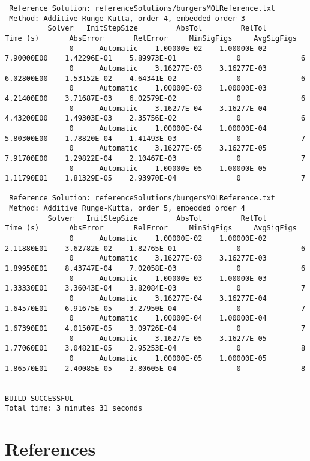 \documentclass[10pt,letterpaper]{article}
\begin{document}
{\begin{verbatim}
 Reference Solution: referenceSolutions/burgersMOLReference.txt
 Method: Additive Runge-Kutta, order 4, embedded order 3
          Solver   InitStepSize         AbsTol         RelTol       Time (s)       AbsError       RelError     MinSigFigs     AvgSigFigs
               0      Automatic    1.00000E-02    1.00000E-02     7.90000E00    1.42296E-01    5.89973E-01              0              6
               0      Automatic    3.16277E-03    3.16277E-03     6.02800E00    1.53152E-02    4.64341E-02              0              6
               0      Automatic    1.00000E-03    1.00000E-03     4.21400E00    3.71687E-03    6.02579E-02              0              6
               0      Automatic    3.16277E-04    3.16277E-04     4.43200E00    1.49303E-03    2.35756E-02              0              6
               0      Automatic    1.00000E-04    1.00000E-04     5.80300E00    1.78820E-04    1.41493E-03              0              7
               0      Automatic    3.16277E-05    3.16277E-05     7.91700E00    1.29822E-04    2.10467E-03              0              7
               0      Automatic    1.00000E-05    1.00000E-05     1.11790E01    1.81329E-05    2.93970E-04              0              7

 Reference Solution: referenceSolutions/burgersMOLReference.txt
 Method: Additive Runge-Kutta, order 5, embedded order 4
          Solver   InitStepSize         AbsTol         RelTol       Time (s)       AbsError       RelError     MinSigFigs     AvgSigFigs
               0      Automatic    1.00000E-02    1.00000E-02     2.11880E01    3.62782E-02    1.82765E-01              0              6
               0      Automatic    3.16277E-03    3.16277E-03     1.89950E01    8.43747E-04    7.02058E-03              0              6
               0      Automatic    1.00000E-03    1.00000E-03     1.33330E01    3.36043E-04    3.82084E-03              0              7
               0      Automatic    3.16277E-04    3.16277E-04     1.64570E01    6.91675E-05    3.27950E-04              0              7
               0      Automatic    1.00000E-04    1.00000E-04     1.67390E01    4.01507E-05    3.09726E-04              0              7
               0      Automatic    3.16277E-05    3.16277E-05     1.77060E01    3.04821E-05    2.95253E-04              0              8
               0      Automatic    1.00000E-05    1.00000E-05     1.86570E01    2.40085E-05    2.80605E-04              0              8


BUILD SUCCESSFUL
Total time: 3 minutes 31 seconds
\end{verbatim}
}

\section{References}



\end{document}
